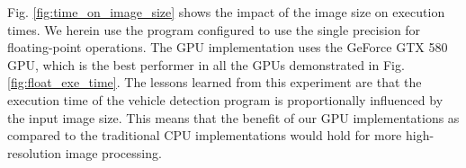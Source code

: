 Fig. \ref{fig:time_on_image_size} shows the impact of the image size on
execution times. 
We herein use the program configured to use the single precision for
floating-point operations.
The GPU implementation uses the GeForce GTX 580 GPU, which is the best
performer in all the GPUs demonstrated in Fig. \ref{fig:float_exe_time}.
The lessons learned from this experiment are that the execution time of
the vehicle detection program is proportionally influenced by the input
image size.
This means that the benefit of our GPU implementations as compared to
the traditional CPU implementations would hold for more high-resolution
image processing.
